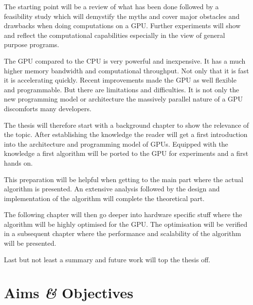 
The starting point will be a review of what has been done followed by a
feasibility study which will demystify the myths and cover major obstacles and
drawbacks when doing computations on a \gls{GPU}. Further experiments will show
and reflect the computational capabilities especially in the view of general 
purpose programs. 


The \gls{GPU} compared to the \gls{CPU} is very powerful and inexpensive. It has
a much higher memory bandwidth and computational throughput. Not only that it is
fast it is accelerating quickly. Recent improvements made the \gls{GPU} as well
flexible and programmable. But there are limitations and difficulties. It is not
only the new programming model or architecture the massively parallel nature of 
a \gls{GPU} discomforts many developers. 


The thesis will therefore start with a background chapter to show the relevance
of the topic. After establishing the knowledge the reader will get a first
introduction into the architecture and programming model of \glspl{GPU}.
Equipped with the knowledge a first algorithm will be ported to the \gls{GPU}
for experiments and a first hands on.

This preparation will be helpful when getting to the main part where the actual
algorithm is presented. An extensive analysis followed by the design and implementation
of the algorithm will complete the theoretical part. 

The following chapter will then go deeper into hardware specific stuff where the
algorithm will be highly optimised for the \gls{GPU}. The optimisation will be 
verified in a subsequent chapter where the performance and scalability of the
algorithm will be presented. 

Last but not least a summary and future work will top the thesis off. 

\section{Aims \textit{\&} Objectives} %
\label{sec:aims_objectives}

